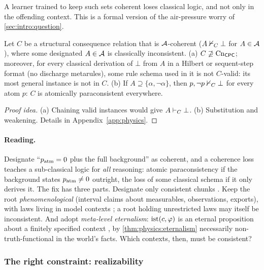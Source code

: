 A learner trained to keep such sets coherent loses classical logic, and not only in
the offending context. This is a formal version of the air-pressure worry of
\cref{sec:intro:question}.

\begin{proposition}\label{prop:physics:misdesignation}
Let $C$ be a structural consequence relation that is $\mathcal{A}$-coherent ($A\nvdash_C\bot$ for
$A\in\mathcal{A}$), where some designated $A\in\mathcal{A}$ is classically inconsistent. \textup{(a)}
$C\not\supseteq\mathrm{Cn}_{\mathsf{CPC}}$; moreover, for every classical derivation of $\bot$ from $A$ in
a Hilbert or sequent-step format (no discharge metarules), some rule schema used in it
is not $C$-valid: its most general instance is not in $C$. \textup{(b)} If
$A\supseteq\{\alpha,\neg\alpha\}$, then $p,\neg p\nvdash_C\bot$ for every atom $p$: $C$ is
atomically paraconsistent everywhere.
\hfill{}\ 
\end{proposition}
\begin{proof}[Proof idea]
(a) Chaining valid instances would give $A\vdash_C\bot$. (b) Substitution and weakening.
Details in Appendix~\ref{app:physics}.
\end{proof}

\paragraph{Reading.} Designate ``$p_{\rm atm}=0$ plus the full background'' as coherent,
and a coherence loss teaches a sub-classical logic for \emph{all} reasoning: atomic
paraconsistency if the background states $p_{\rm atm}\neq0$ outright, the loss of some
classical schema if it only derives it. The fix has three parts. Designate only
consistent chunks \citep{brown2004chunk}. Keep the root \emph{phenomenological} (interval
claims about measurables, observations, exports), with laws living in model contexts
\citep{cartwright1983laws,wilson2006wandering}; a root holding unrestricted laws may itself
be inconsistent. And adopt \emph{meta-level eternalism}: $\mathrm{ist}(c,\varphi)$ is an eternal
proposition about a finitely specified context \citep{mccarthy1993notes}, by
\cref{thm:physics:eternalism} necessarily non-truth-functional in the world's facts.
Which contexts, then, must be consistent?

\subsubsection{The right constraint: realizability}

